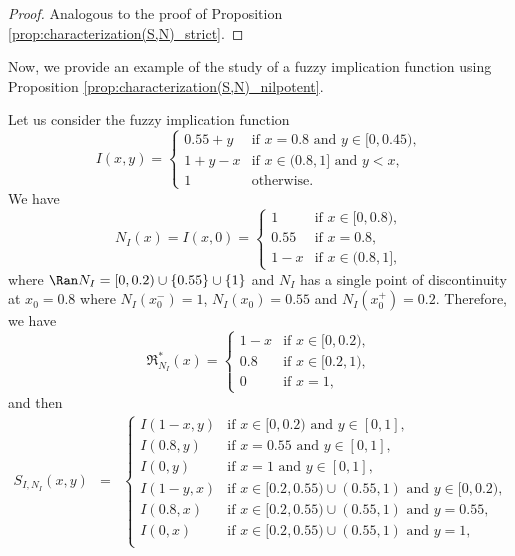 \begin{proof}
	Analogous to the proof of Proposition \ref{prop:characterization(S,N)_strict}.
\end{proof}

Now, we provide an example of the study of a fuzzy implication function using Proposition \ref{prop:characterization(S,N)_nilpotent}.

\begin{example} Let us consider the fuzzy implication function
	$$
	I(x,y) =
	\left\{ \begin{array}{ll}
		0.55+y &   \text{if }   x=0.8 \text{ and  } y \in [0,0.45), \\
		1+y-x &   \text{if }   x \in (0.8,1] \text{ and } y < x, \\
		1 & \text{otherwise.}
	\end{array} \right.
	$$
	We have
	$$
	N_{I}(x) = I(x,0) =
	\left\{ \begin{array}{ll}
		1 & \text{if } x \in [0,0.8),\\
		0.55 & \text{if } x=0.8, \\
		1-x & \text{if } x \in (0.8,1],
	\end{array} \right.
	$$
	where $\Ran N_{I} = [0,0.2) \cup \{0.55\} \cup \{1\}$ and $N_{I}$ has a single point of discontinuity at $x_0 =0.8$ where $N_{I}(x_0^{-})=1$, $N_{I}(x_0)=0.55$ and $N_{I}(x_0^{+})=0.2$. Therefore, we have
	$$
	\mathfrak{R}^*_{N_{I}}(x) =
	\left\{ \begin{array}{ll}
		1-x &   \text{if }   x \in [0,0.2), \\
		0.8 &   \text{if }   x \in [0.2,1), \\
		0 &   \text{if }   x=1,
	\end{array} \right.
	$$
	and then
	\begin{eqnarray*}
		S_{I,N_{I}}(x,y) 
		&=&  
		\left\{ \begin{array}{ll}
			I(1-x,y) &   \text{if }   x \in [0,0.2) \text{ and } y \in [0,1], \\
			I(0.8,y) &   \text{if }   x  = 0.55 \text{ and } y \in [0,1], \\
			I(0,y) &   \text{if }   x=1 \text{ and } y \in [0,1], \\
			I(1-y,x) &   \text{if }   x \in [0.2,0.55) \cup (0.55,1) \text{ and } y \in [0,0.2), \\
			I(0.8,x) &   \text{if }   x \in [0.2,0.55) \cup (0.55,1) \text{ and } y=0.55, \\
			I(0,x) &   \text{if }   x \in [0.2,0.55) \cup (0.55,1) \text{ and } y=1, \\

\end{array}
\end{eqnarray*}
\end{example}
